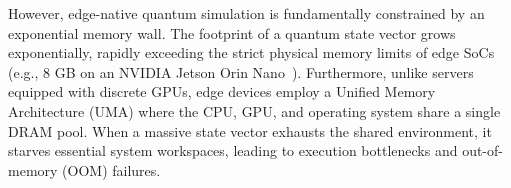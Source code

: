 However, edge-native quantum simulation is fundamentally constrained by an exponential memory wall. The footprint of a quantum state vector grows exponentially, rapidly exceeding the strict physical memory limits of edge SoCs (e.g., 8 GB on an NVIDIA Jetson Orin Nano~\cite{jetson_orin_nano}). Furthermore, unlike servers equipped with discrete GPUs, edge devices employ a Unified Memory Architecture (UMA) where the CPU, GPU, and operating system share a single DRAM pool. When a massive state vector exhausts the shared environment, it starves essential system workspaces, leading to execution bottlenecks and out-of-memory (OOM) failures.



